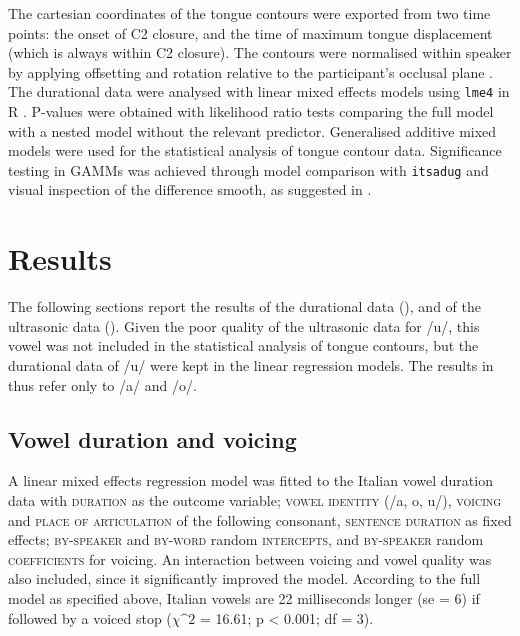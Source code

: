 \documentclass[authoryear, twocolumn]{elsarticle}
\begin{document}
The cartesian coordinates of the tongue contours were exported from two
time points: the onset of C2 closure, and the time of maximum tongue
displacement (which is always within C2 closure). The contours were
normalised within speaker by applying offsetting and rotation relative
to the participant's occlusal plane \citep{scobbie2011}. The durational
data were analysed with linear mixed effects models using \texttt{lme4}
in R \citep{r-core-team2017, bates2015}. P-values were obtained with
likelihood ratio tests comparing the full model with a nested model
without the relevant predictor. Generalised additive mixed models
\citep[GAMMs,][]{wood2006, zuur2012} were used for the statistical
analysis of tongue contour data. Significance testing in GAMMs was
achieved through model comparison with \texttt{itsadug}
\citep{van-rij2017} and visual inspection of the difference smooth, as
suggested in \citet{soskuthy2017}.

\section{Results}\label{results}

The following sections report the results of the durational data
(), and of the ultrasonic data ().
Given the poor quality of the ultrasonic data for /u/, this vowel was
not included in the statistical analysis of tongue contours, but the
durational data of /u/ were kept in the linear regression models. The
results in  thus refer only to /a/ and /o/.

\subsection{Vowel duration and
voicing}\label{vowel-duration-and-voicing}

\label{s:vow-duration}

A linear mixed effects regression model was fitted to the Italian vowel
duration data with \textsc{duration} as the outcome variable;
\textsc{vowel identity} (/a, o, u/), \textsc{voicing} and
\textsc{place of articulation} of the following consonant,
\textsc{sentence duration} as fixed effects; \textsc{by-speaker} and
\textsc{by-word} random \textsc{intercepts}, and \textsc{by-speaker}
random \textsc{coefficients} for voicing. An interaction between voicing
and vowel quality was also included, since it significantly improved the
model. According to the full model as specified above, Italian vowels
are 22 milliseconds longer (se = 6) if followed by a voiced stop
(\(\chi\^2\) = 16.61; p \textless{} 0.001; df = 3).
\end{document}
